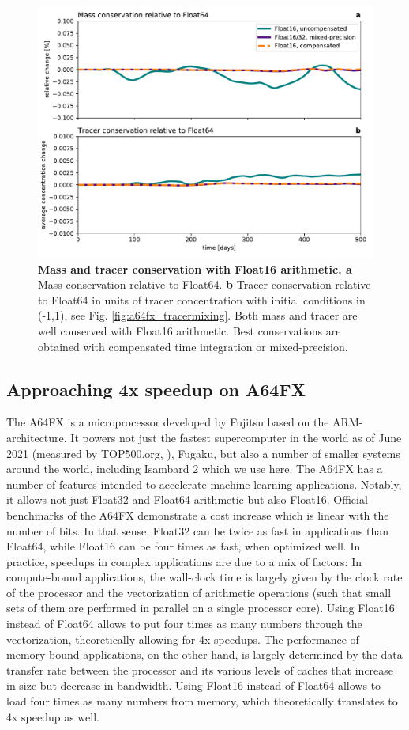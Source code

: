 \begin{figure}[tbhp]
	\includegraphics[width=1\textwidth]{Figures/a64fx/conservation.pdf}
	\caption{\textbf{Mass and tracer conservation with Float16 arithmetic. a}
	Mass conservation relative to Float64. \textbf{b} Tracer conservation relative to Float64 in units of tracer
	concentration with initial conditions in (-1,1), see Fig. \ref{fig:a64fx_tracermixing}. Both mass and tracer
	are well conserved with Float16 arithmetic. Best conservations are obtained with compensated time
	integration or mixed-precision.}
	\label{fig:a64fx_conservation}
\end{figure}

\subsection{Approaching 4x speedup on A64FX}
The A64FX is a microprocessor developed by Fujitsu based on the ARM-architecture. It powers not just the fastest
supercomputer in the world as of June 2021 (measured by TOP500.org, \cite{Dongarra2011}), Fugaku, but
also a number of smaller systems around the world, including Isambard 2 which we use here. The A64FX has a
number of features intended to accelerate machine learning applications. Notably, it allows not just Float32 and
Float64 arithmetic but also Float16. Official benchmarks of the A64FX demonstrate a cost increase which is linear
with the number of bits. In that sense, Float32 can be twice as fast in applications than Float64, while Float16 can
be four times as fast, when optimized well. In practice, speedups in complex applications are due to a mix of factors:
In compute-bound applications, the wall-clock time is largely given by the clock rate of the processor and the
vectorization of arithmetic operations (such that small sets of them are performed in parallel on a single processor core).
Using Float16 instead of Float64 allows to put four times as many numbers through the vectorization, theoretically
allowing for 4x speedups. The performance of memory-bound applications, on the other hand, is largely determined
by the data transfer rate between the processor and its various levels of caches that increase in size but decrease
in bandwidth. Using Float16 instead of Float64 allows to load four times as many numbers from memory,
which theoretically translates to 4x speedup as well. 

